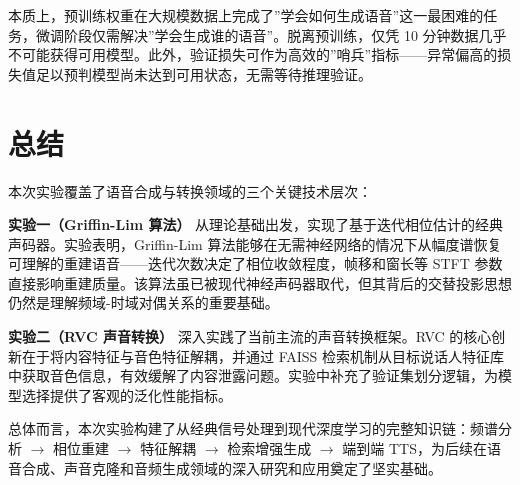 \documentclass[
  english,
  letterpaper,
  DIV=11,
  numbers=noendperiod]{scrartcl}
\begin{document}
本质上，预训练权重在大规模数据上完成了''学会如何生成语音''这一最困难的任务，微调阶段仅需解决''学会生成谁的语音''。脱离预训练，仅凭
10
分钟数据几乎不可能获得可用模型。此外，验证损失可作为高效的''哨兵''指标------异常偏高的损失值足以预判模型尚未达到可用状态，无需等待推理验证。

\section{总结}\label{ux603bux7ed3}

本次实验覆盖了语音合成与转换领域的三个关键技术层次：

\textbf{实验一（Griffin-Lim 算法）}
从理论基础出发，实现了基于迭代相位估计的经典声码器。实验表明，Griffin-Lim
算法能够在无需神经网络的情况下从幅度谱恢复可理解的重建语音------迭代次数决定了相位收敛程度，帧移和窗长等
STFT
参数直接影响重建质量。该算法虽已被现代神经声码器取代，但其背后的交替投影思想仍然是理解频域-时域对偶关系的重要基础。

\textbf{实验二（RVC 声音转换）} 深入实践了当前主流的声音转换框架。RVC
的核心创新在于将内容特征与音色特征解耦，并通过 FAISS
检索机制从目标说话人特征库中获取音色信息，有效缓解了内容泄露问题。实验中补充了验证集划分逻辑，为模型选择提供了客观的泛化性能指标。

总体而言，本次实验构建了从经典信号处理到现代深度学习的完整知识链：频谱分析
\(\rightarrow\) 相位重建 \(\rightarrow\) 特征解耦 \(\rightarrow\)
检索增强生成 \(\rightarrow\) 端到端
TTS，为后续在语音合成、声音克隆和音频生成领域的深入研究和应用奠定了坚实基础。
\end{document}
